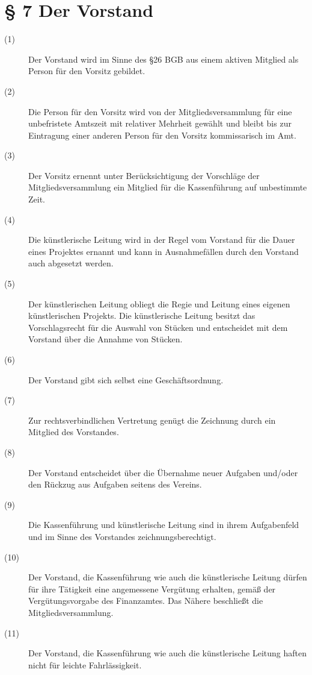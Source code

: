 \documentclass[a4paper,12pt]{scrartcl}
\begin{document}
\section*{\S{} 7 Der Vorstand}
\begin{description} 

\item[(1)] Der Vorstand wird im Sinne des §26 BGB aus einem aktiven Mitglied als Person für den Vorsitz gebildet.
\item[(2)] Die Person für den Vorsitz wird von der Mitgliedsversammlung für eine unbefristete Amtszeit mit relativer Mehrheit gewählt und bleibt bis zur Eintragung einer anderen Person für den Vorsitz kommissarisch im Amt.
\item[(3)] Der Vorsitz ernennt unter Berücksichtigung der Vorschläge der Mitgliedsversammlung ein Mitglied für die Kassenführung auf unbestimmte Zeit.
\item[(4)] Die künstlerische Leitung wird in der Regel vom Vorstand für die Dauer eines Projektes ernannt und kann in Ausnahmefällen durch den Vorstand auch abgesetzt werden.
\item[(5)] Der künstlerischen Leitung obliegt die Regie und Leitung eines eigenen künstlerischen Projekts. Die künstlerische Leitung besitzt das Vorschlagsrecht für die Auswahl von Stücken und entscheidet mit dem Vorstand über die Annahme von Stücken.
\item[(6)] Der Vorstand gibt sich selbst eine Geschäftsordnung.
\item[(7)] Zur rechtsverbindlichen Vertretung genügt die Zeichnung durch ein Mitglied des Vorstandes.
\item[(8)] Der Vorstand entscheidet über die Übernahme neuer Aufgaben und/oder den Rückzug aus Aufgaben seitens des Vereins.
\item[(9)] Die Kassenführung und künstlerische Leitung sind in ihrem Aufgabenfeld und im Sinne des Vorstandes zeichnungsberechtigt.
\item[(10)] Der Vorstand, die Kassenführung wie auch die künstlerische Leitung dürfen für ihre Tätigkeit eine angemessene Vergütung erhalten, gemäß der Vergütungsvorgabe des Finanzamtes. Das Nähere beschließt die Mitgliedsversammlung.
\item[(11)] Der Vorstand, die Kassenführung wie auch die künstlerische Leitung haften nicht für leichte Fahrlässigkeit.

\end{description}
\end{document}
